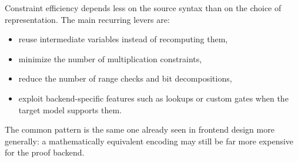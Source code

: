 \documentclass[11pt]{article}
\begin{document}
Constraint efficiency depends less on the source syntax than on the choice of
representation.  The main recurring levers are:
\begin{itemize}
  \item reuse intermediate variables instead of recomputing them,
  \item minimize the number of multiplication constraints,
  \item reduce the number of range checks and bit decompositions,
  \item exploit backend-specific features such as lookups or custom gates when
        the target model supports them.
\end{itemize}

The common pattern is the same one already seen in frontend design more
generally: a mathematically equivalent encoding may still be far more expensive
for the proof backend.
\end{document}
